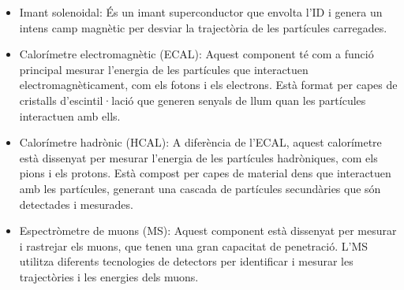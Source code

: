 \begin{itemize}
\item Imant solenoidal: És un imant superconductor que envolta l'ID i genera un intens camp magnètic per desviar
	la trajectòria de les partícules carregades.
	
\item Calorímetre electromagnètic (ECAL): Aquest component té com a funció principal 
	mesurar l'energia de les partícules que interactuen electromagnèticament, com els 
	fotons i els electrons. Està format per capes de cristalls d'escintil·lació que generen 
	senyals de llum quan les partícules interactuen amb ells.
	
\item Calorímetre hadrònic (HCAL): A diferència de l'ECAL, aquest calorímetre està 
	dissenyat per mesurar l'energia de les partícules hadròniques, com els pions i 
	els protons. Està compost per capes de material dens que interactuen amb 
	les partícules, generant una cascada de partícules secundàries que 
	són detectades i mesurades.
	
\item Espectròmetre de muons (MS): Aquest component està dissenyat per mesurar i rastrejar 
	els muons, que tenen una gran capacitat de penetració. L'MS utilitza diferents tecnologies 
	de detectors per identificar i mesurar les trajectòries i les energies dels muons.
\end{itemize}




